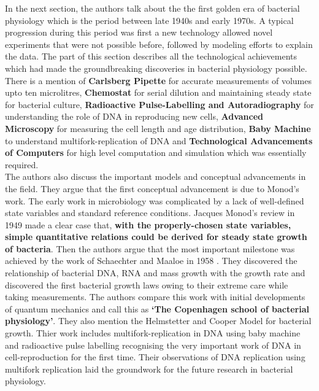 \documentclass[12pt]{article}
\begin{document}
	In the next section, the authors talk about the the first golden era of bacterial physiology which is the period between late 1940s and early 1970s. A typical progression during this period was first a new technology allowed novel experiments that were not possible before, followed by modeling efforts to explain the data. The part of this section describes all the technological achievements which had made the groundbreaking discoveries in bacterial physiology possible. There is a mention of \textbf{Carlsberg Pipette} for accurate measurements of volumes upto ten microlitres, \textbf{Chemostat} for serial dilution and maintaining steady state for bacterial culture, \textbf{Radioactive Pulse-Labelling and Autoradiography} for understanding the role of DNA in reproducing new cells, \textbf{Advanced Microscopy} for measuring the cell length and age distribution, \textbf{Baby Machine} to understand multifork-replication of DNA and \textbf{Technological Advancements of Computers} for high level computation and simulation which was essentially required.\\
	
	The authors also discuss the important models and conceptual advancements in the field. They argue that the first conceptual advancement is due to Monod's work. The early work in microbiology was complicated by a lack of well-defined state variables and standard reference conditions. Jacques Monod’s review in 1949 \cite{monod} made a clear case that, \textbf{with the properly-chosen state variables, simple quantitative relations could be derived for steady state growth of bacteria}. Then the authors argue that the most important milestone was achieved by the work of Schaechter and Maaloe in 1958 \cite{sm1,sm2}. They discovered the relationship of bacterial DNA, RNA and mass growth with the growth rate and discovered the first bacterial growth laws owing to their extreme care while taking measurements. The authors compare this work with initial developments of quantum mechanics and call this as \textbf{`The Copenhagen school of bacterial physiology'}. They also mention the Helmstetter and Cooper Model \cite{hc} for bacterial growth. Thier work includes multifork-replication in DNA using baby machine and radioactive pulse labelling recognising the very important work of DNA in cell-reproduction for the first time. Their observations of DNA replication using multifork replication laid the groundwork for the future research in bacterial physiology.\\
	
\end{document}
